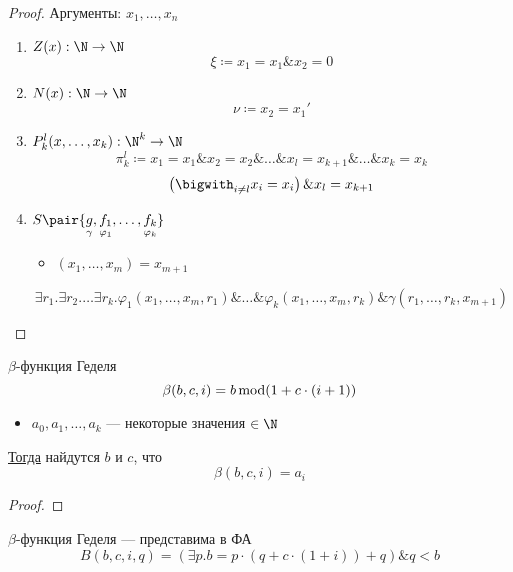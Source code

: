 \documentclass[oneside]{book}
\begin{document}
\begin{proof}
	Аргументы: \(x_1, \dots, x_n\)
	\begin{enumerate}
		\item \(Z(x): \N \to \N\)
		      \[ \xi \coloneqq x_1 = x_1 \& x_2 = 0 \]
		\item \(N(x): \N \to \N\)
		      \[ \nu \coloneqq x_2 = x_1' \]
		\item \(P_k^l(x, \dots, x_k): \N^k \to \N\)
		      \[ \pi_k^l \coloneqq x_1 = x_1 \& x_2 = x_2 \& \dots \& x_l = x_{k + 1} \& \dots \& x_k = x_k\]
		      \[ \left(\bigwith_{i \neq l} x_i = x_i\right) \& x_l = x_{k + 1} \]
		\item \(S\pair{\underset{\gamma}{g}, \underset{\varphi_1}{f_1}, \dots, \underset{\varphi_k}{f_k}}\)
		      \begin{itemize}
			      \item \((x_1, \dots, x_m) = x_{m + 1}\)
		      \end{itemize}
		      \[ \exists r_1. \exists r_2. \dots\exists r_k. \varphi_1(x_1, \dots, x_m, r_1) \& \dots \& \varphi_k(x_1, \dots, x_m, r_k) \& \gamma(r_1, \dots, r_k, x_{m + 1}) \]
	\end{enumerate}
	\label{org29e8e43}
\end{proof}
\begin{definition}
	\(\beta\)-функция Геделя
	\[ \beta(b, c, i) = b \mathop{\rm mod} (1 + c\cdot(i + 1)) \]
	\label{org78562f2}
\end{definition}
\begin{theorem}
	\-
	\begin{itemize}
		\item \(a_0, a_1, \dots, a_k\) --- некоторые значения \(\in \N\)
	\end{itemize}
	\uline{Тогда} найдутся \(b\) и \(c\), что
	\[ \beta(b, c, i) = a_i \]
	\label{org1aa95f9}
\end{theorem}
\begin{proof}
	\todo
\end{proof}
\begin{remark}
	\(\beta\)-функция Геделя --- представима в ФА
	\[ B(b, c, i, q) = (\exists p. b = p\cdot(q + c\cdot(1 + i)) + q) \& q < b \]
	\label{org2fd19bd}
\end{remark}
\end{document}
